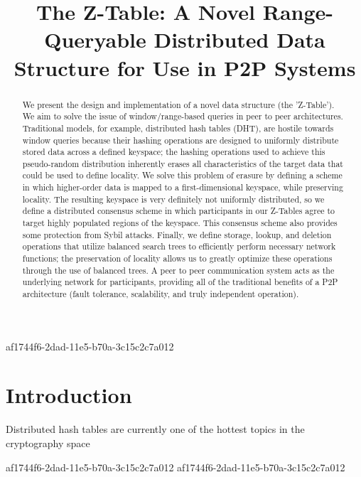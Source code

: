 \documentclass[12pt]{article}
\title{The Z-Table: A Novel Range-Queryable Distributed Data Structure for Use in P2P Systems}
\begin{document}
\maketitle

af1744f6-2dad-11e5-b70a-3c15c2c7a012\begin{abstract}
We present the design and implementation of a novel data structure (the 'Z-Table'). We aim to solve the issue of window/range-based queries in peer to peer architectures. Traditional models, for example,  distributed hash tables (DHT), are hostile towards window queries because their hashing operations are designed to uniformly distribute stored data across a defined keyspace; the hashing operations used to achieve this pseudo-random distribution inherently erases all characteristics of the target data that could be used to define locality. We solve this problem of erasure by defining a scheme in which higher-order data is mapped to a first-dimensional keyspace, while preserving locality. The resulting keyspace is very definitely not uniformly distributed, so we define a distributed consensus scheme in which participants in our Z-Tables agree to target highly populated regions of the keyspace. This consensus scheme also provides some protection from Sybil attacks. Finally, we define storage, lookup, and deletion operations that utilize balanced search trees to efficiently perform necessary network functions; the preservation of locality allows us to greatly optimize these operations through the use of balanced trees. A peer to peer communication system acts as the underlying network for participants, providing all of the traditional benefits of a P2P architecture (fault tolerance, scalability, and truly independent operation).
\end{abstract}


\newpage
\section{Introduction}
Distributed hash tables are currently one of the hottest topics in the cryptography space~\cite{Stoica:2001dj,Rowstron:2001ea,Ratnasamy:2001wn}

af1744f6-2dad-11e5-b70a-3c15c2c7a012\printbibliography
af1744f6-2dad-11e5-b70a-3c15c2c7a012
\end{document}
